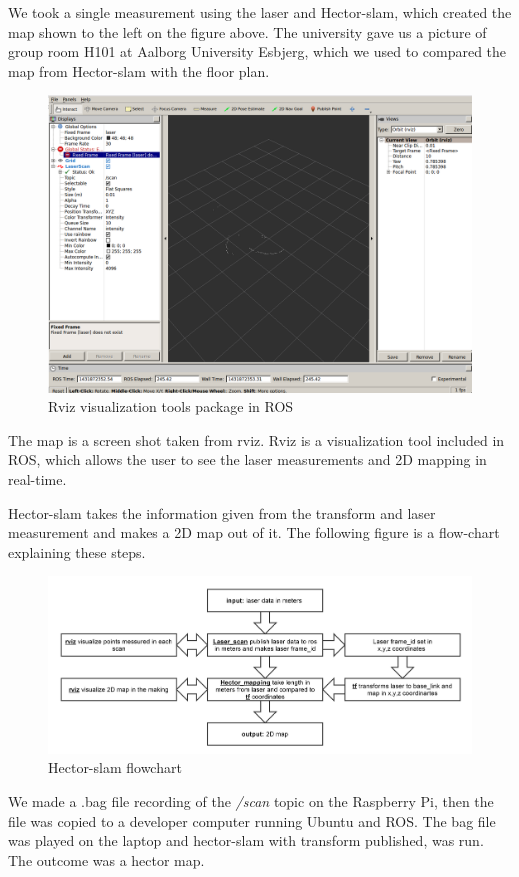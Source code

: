 We took a single measurement using the laser and Hector-slam, which created the map shown to the left on the figure above. The university gave us a picture of group room H101 at Aalborg University Esbjerg, which we used to compared the map from Hector-slam with the floor plan. 

\begin{figure}[H]
	\centering
	\includegraphics[width=.5\linewidth]{images/rviz.png}
	\caption{Rviz visualization tools package in ROS}
	\label{rviz}
\end{figure}

The map is a screen shot taken from rviz. Rviz is a visualization tool included in ROS, which allows the user to see the laser measurements and 2D mapping in real-time.\cite{rviz}

Hector-slam takes the information given from the transform and laser measurement and makes a 2D map out of it. The following figure is a flow-chart explaining these steps.

\begin{figure}[H]
	\centering
	\includegraphics[width=1\linewidth]{images/hector_flow.png}
	\caption{Hector-slam flowchart}
	\label{fig:rosflow}
\end{figure}

We made a .bag file recording of the \textit{/scan} topic on the Raspberry Pi, then the file was copied to a developer computer running Ubuntu and ROS. The bag file was played on the laptop and hector-slam with transform published, was run. The outcome was a hector map.

 

